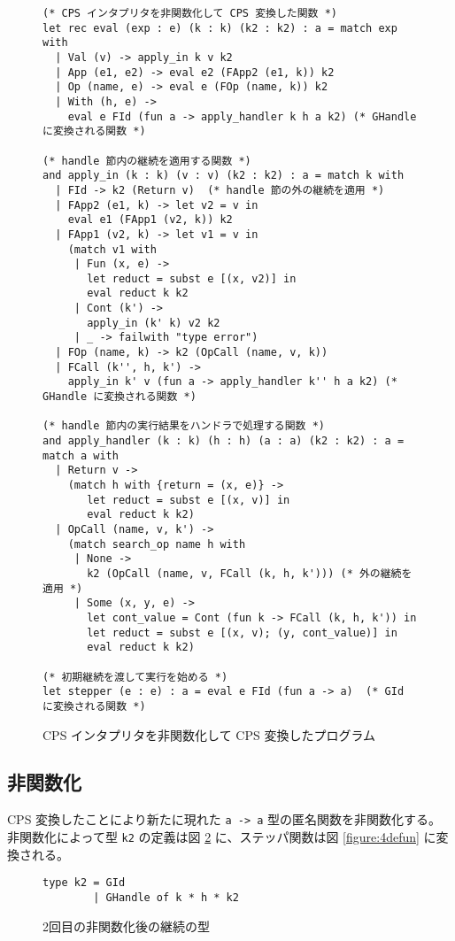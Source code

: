 \begin{figure}
\begin{verbatim}
(* CPS インタプリタを非関数化して CPS 変換した関数 *)
let rec eval (exp : e) (k : k) (k2 : k2) : a = match exp with
  | Val (v) -> apply_in k v k2
  | App (e1, e2) -> eval e2 (FApp2 (e1, k)) k2
  | Op (name, e) -> eval e (FOp (name, k)) k2
  | With (h, e) ->
    eval e FId (fun a -> apply_handler k h a k2) (* GHandle に変換される関数 *)

(* handle 節内の継続を適用する関数 *)
and apply_in (k : k) (v : v) (k2 : k2) : a = match k with
  | FId -> k2 (Return v)  (* handle 節の外の継続を適用 *)
  | FApp2 (e1, k) -> let v2 = v in
    eval e1 (FApp1 (v2, k)) k2
  | FApp1 (v2, k) -> let v1 = v in
    (match v1 with
     | Fun (x, e) ->
       let reduct = subst e [(x, v2)] in
       eval reduct k k2
     | Cont (k') ->
       apply_in (k' k) v2 k2
     | _ -> failwith "type error")
  | FOp (name, k) -> k2 (OpCall (name, v, k))
  | FCall (k'', h, k') ->
    apply_in k' v (fun a -> apply_handler k'' h a k2) (* GHandle に変換される関数 *)

(* handle 節内の実行結果をハンドラで処理する関数 *)
and apply_handler (k : k) (h : h) (a : a) (k2 : k2) : a = match a with
  | Return v ->
    (match h with {return = (x, e)} ->
       let reduct = subst e [(x, v)] in
       eval reduct k k2)
  | OpCall (name, v, k') ->
    (match search_op name h with
     | None ->
       k2 (OpCall (name, v, FCall (k, h, k'))) (* 外の継続を適用 *)
     | Some (x, y, e) ->
       let cont_value = Cont (fun k -> FCall (k, h, k')) in
       let reduct = subst e [(x, v); (y, cont_value)] in
       eval reduct k k2)

(* 初期継続を渡して実行を始める *)
let stepper (e : e) : a = eval e FId (fun a -> a)  (* GId に変換される関数 *)
\end{verbatim}
\caption{CPS インタプリタを非関数化して CPS 変換したプログラム}
\label{figure:3cps}
\end{figure}

\subsection{非関数化}
\label{subsection:4defun}

CPS 変換したことにより新たに現れた \texttt{a -> a} 型の匿名関数を非関数化する。非関数化によって型 \texttt{k2} の定義は図 \ref{figure:k2_4defun} に、ステッパ関数は図 \ref{figure:4defun} に変換される。

\begin{figure}
\begin{verbatim}
type k2 = GId
        | GHandle of k * h * k2
\end{verbatim}
\caption{2回目の非関数化後の継続の型}
\label{figure:k2_4defun}
\end{figure}

